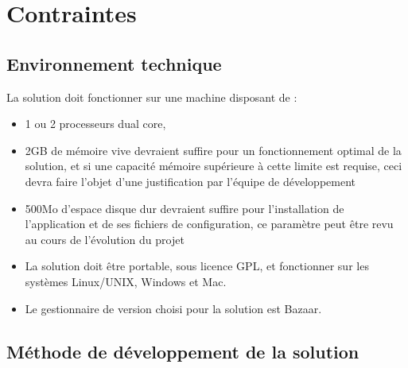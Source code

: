 \documentclass{ultimaade-fr}
\begin{document}
\section{Contraintes}

\subsection{Environnement technique}

La solution doit fonctionner sur une machine disposant de :
\begin{itemize}
\item 1 ou 2 processeurs dual core,
\item 2GB  de  mémoire  vive  devraient  suffire  pour  un  fonctionnement  optimal  de  la solution, et si une capacité mémoire supérieure à cette limite est requise, ceci devra faire l’objet d’une justification par l’équipe de développement
\item 500Mo d’espace disque dur devraient suffire pour l’installation de l’application et de
  ses fichiers de configuration, ce paramètre peut être revu au cours de l’évolution du projet
\item La solution doit être portable, sous licence GPL, et fonctionner sur les systèmes Linux/UNIX, Windows et
  Mac.
\item    Le gestionnaire de version choisi pour la solution est Bazaar.
\end{itemize}

\subsection{Méthode de développement de la solution}
\end{document}
